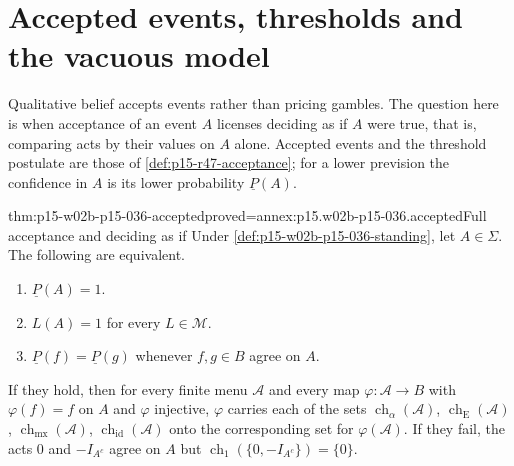 \section{Accepted events, thresholds and the vacuous model}
\label{sec:p15-w02b-p15-036-acceptance}

Qualitative belief accepts events rather than pricing gambles. The
question here is when acceptance of an event \(A\) licenses deciding as if
\(A\) were true, that is, comparing acts by their values on \(A\) alone.
Accepted events and the threshold postulate are those of
\cref{def:p15-r47-acceptance}; for a lower prevision the confidence in
\(A\) is its lower probability \(\underline P(A)\).

\begin{hbtheorem}{thm:p15-w02b-p15-036-accepted}{proved=annex:p15.w02b-p15-036.accepted}{Full acceptance and deciding as if}
Under \cref{def:p15-w02b-p15-036-standing}, let \(A\in\Sigma\). The
following are equivalent.
\begin{enumerate}
\item \(\underline P(A)=1\).
\item \(L(A)=1\) for every \(L\in\mathcal M\).
\item \(\underline P(f)=\underline P(g)\) whenever \(f,g\in B\) agree on
 \(A\).
\end{enumerate}
If they hold, then for every finite menu \(\mathcal A\) and every map
\(\varphi:\mathcal A\to B\) with \(\varphi(f)=f\) on \(A\) and
\(\varphi\) injective, \(\varphi\) carries each of the sets
\(\operatorname{ch}_\alpha(\mathcal A)\),
\(\operatorname{ch}_{\mathrm E}(\mathcal A)\),
\(\operatorname{ch}_{\mathrm{mx}}(\mathcal A)\),
\(\operatorname{ch}_{\mathrm{id}}(\mathcal A)\) onto the corresponding set
for \(\varphi(\mathcal A)\). If they fail, the acts \(0\) and
\(-I_{A^c}\) agree on \(A\) but
\(\operatorname{ch}_1(\{0,-I_{A^c}\})=\{0\}\).
\end{hbtheorem}

